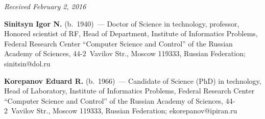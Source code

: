 \vspace*{-3pt}

\hfill{\small\textit{Received February 2, 2016}}

\Contr

\noindent
\textbf{Sinitsyn Igor N.} (b.\ 1940)~---
Doctor of Science in technology, professor,
Honored scientist of RF, Head of Department, Institute of Informatics Problems, Federal Research Center ``Computer Science and
Control'' of the Russian Academy of Sciences, 44-2~Vavilov Str.,
Moscow 119333, Russian Federation; sinitsin@dol.ru

\vspace*{3pt}

\noindent
\textbf{Korepanov Eduard R.} (b.\ 1966)~---
Candidate of Science (PhD) in technology, 
Head of Laboratory, Institute of Informatics Problems, Federal Research Center 
``Computer Science and Control'' of the Russian Academy of Sciences, 
44-2~Vavilov Str., Moscow 119333, Russian Federation; ekorepanov@ipiran.ru 

\label{end\stat}


\renewcommand{\bibname}{\protect\rm Литература}